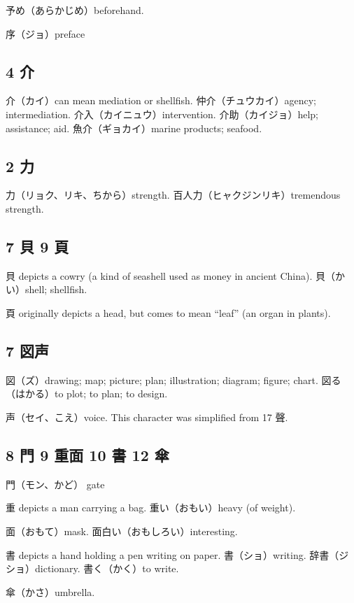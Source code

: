 予め（あらかじめ）beforehand.

序（ジョ）preface

\subsection{4 介}

介（カイ）can mean mediation or shellfish.
仲介（チュウカイ）agency; intermediation.
介入（カイニュウ）intervention.
介助（カイジョ）help; assistance; aid.
魚介（ギョカイ）marine products; seafood.

\subsection{2 力}

力（リョク、リキ、ちから）strength.
百人力（ヒャクジンリキ）tremendous strength.

\subsection{7 貝 9 頁}

貝 depicts a cowry (a kind of seashell used as money in ancient China).
貝（かい）shell; shellfish.

頁 originally depicts a head,
but comes to mean ``leaf'' (an organ in plants).

\subsection{7 図声}

図（ズ）drawing; map; picture; plan; illustration; diagram; figure; chart.
図る（はかる）to plot; to plan; to design.

声（セイ、こえ）voice.
This character was simplified from 17 聲.

\subsection{8 門 9 重面 10 書 12 傘}

門（モン、かど） gate

重 depicts a man carrying a bag.
重い（おもい）heavy (of weight).

面（おもて）mask.
面白い（おもしろい）interesting.

書 depicts a hand holding a pen writing on paper.
書（ショ）writing.
辞書（ジショ）dictionary.
書く（かく）to write.

傘（かさ）umbrella.
